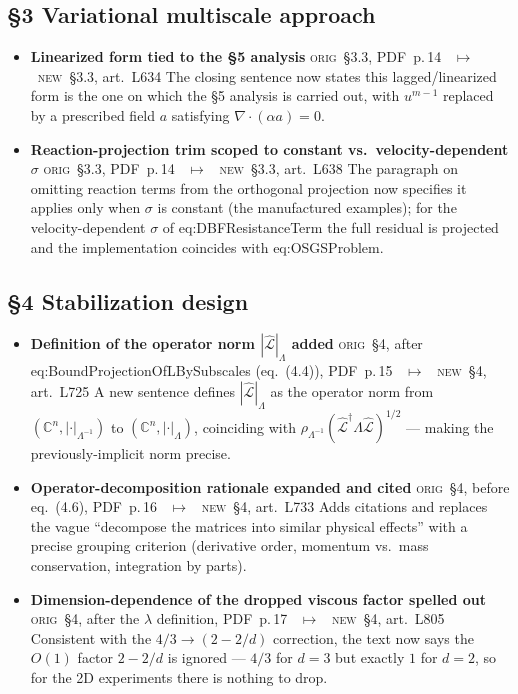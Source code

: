 \documentclass[11pt]{article}
\newcommand{\Orig}{\textcolor{origc}{\footnotesize\textsc{orig}}}
\newcommand{\New}{\textcolor{newc}{\footnotesize\textsc{new}}}
\newcommand{\code}[1]{\textcolor{newc}{\ttfamily\small #1}}
\newcommand{\pdfp}[1]{PDF~p.\,#1}
\newcommand{\artl}[1]{art.\ L#1}       %
\newcommand{\ch}[4]{%
  \item \textbf{#1}\newline
    {\footnotesize\Orig\ #2 \ \textcolor{locc}{$\longmapsto$} \ \New\ #3}\newline
    #4}
\begin{document}
\subsection{\S3 Variational multiscale approach}
\begin{itemize}
\ch{Linearized form tied to the \S5 analysis}
   {\S3.3, \pdfp{14}}
   {\S3.3, \artl{634}}
   {The closing sentence now states this lagged/linearized form is the one on which the \S5 analysis
    is carried out, with $u^{m-1}$ replaced by a prescribed field $a$ satisfying
    $\nabla\!\cdot\!(\alpha a)=0$.}
\ch{Reaction-projection trim scoped to constant vs.\ velocity-dependent $\sigma$}
   {\S3.3, \pdfp{14}}
   {\S3.3, \artl{638}}
   {The paragraph on omitting reaction terms from the orthogonal projection now specifies it applies
    only when $\sigma$ is constant (the manufactured examples); for the velocity-dependent $\sigma$
    of \code{eq:DBFResistanceTerm} the full residual is projected and the implementation coincides
    with \code{eq:OSGSProblem}.}
\end{itemize}

\subsection{\S4 Stabilization design}
\begin{itemize}
\ch{Definition of the operator norm $|\widehat{\mathcal L}|_\Lambda$ added}
   {\S4, after \code{eq:BoundProjectionOfLBySubscales} (eq.~(4.4)), \pdfp{15}}
   {\S4, \artl{725}}
   {A new sentence defines $|\widehat{\mathcal L}|_\Lambda$ as the operator norm from
    $(\mathbb C^n,|\cdot|_{\Lambda^{-1}})$ to $(\mathbb C^n,|\cdot|_\Lambda)$, coinciding with
    $\rho_{\Lambda^{-1}}(\widehat{\mathcal L}^\dagger\Lambda\widehat{\mathcal L})^{1/2}$ --- making the
    previously-implicit norm precise.}
\ch{Operator-decomposition rationale expanded and cited}
   {\S4, before eq.~(4.6), \pdfp{16}}
   {\S4, \artl{733}}
   {Adds citations and replaces the vague ``decompose the matrices into similar physical effects''
    with a precise grouping criterion (derivative order, momentum vs.\ mass conservation,
    integration by parts).}
\ch{Dimension-dependence of the dropped viscous factor spelled out}
   {\S4, after the $\lambda$ definition, \pdfp{17}}
   {\S4, \artl{805}}
   {Consistent with the $4/3\to(2-2/d)$ correction, the text now says the $O(1)$ factor $2-2/d$ is
    ignored --- $4/3$ for $d{=}3$ but exactly $1$ for $d{=}2$, so for the 2D experiments there is
    nothing to drop.}
\end{itemize}
\end{document}
